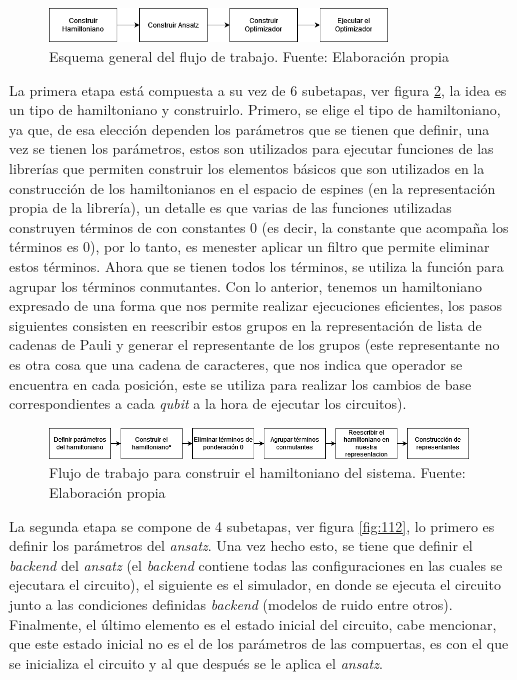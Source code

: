 \begin{figure}[H]
\centering
\includegraphics[width=0.8\textwidth]{figures/S3/flujogeneral.png}
\caption{\label{fig:110} Esquema general del flujo de trabajo. Fuente: Elaboración propia}
\end{figure}

La primera etapa está compuesta a su vez de 6 subetapas, ver figura \ref{fig:111}, la idea es un tipo de hamiltoniano y construirlo. Primero, se elige el tipo de hamiltoniano, ya que, de esa elección dependen los parámetros que se tienen que definir, una vez se tienen los parámetros, estos son utilizados para ejecutar funciones de las librerías que permiten construir los elementos básicos que son utilizados en la construcción de los hamiltonianos en el espacio de espines (en la representación propia de la librería), un detalle es que varias de las funciones utilizadas construyen términos de con constantes 0 (es decir, la constante que acompaña los términos es 0), por lo tanto, es menester aplicar un filtro que permite eliminar estos términos. Ahora que se tienen todos los términos, se utiliza la función para agrupar los términos conmutantes. Con lo anterior, tenemos un hamiltoniano expresado de una forma que nos permite realizar ejecuciones eficientes, los pasos siguientes consisten en reescribir estos grupos en la representación de lista de cadenas de Pauli y generar el representante de los grupos (este representante no es otra cosa que una cadena de caracteres, que nos indica que operador se encuentra en cada posición, este se utiliza para realizar los cambios de base correspondientes a cada \textit{qubit} a la hora de ejecutar los circuitos).

\begin{figure}[H]
\centering
\includegraphics[width=0.99\textwidth]{figures/S3/flujo1.png}
\caption{\label{fig:111} Flujo de trabajo para construir el hamiltoniano del sistema. Fuente: Elaboración propia}
\end{figure}


La segunda etapa se compone de 4 subetapas, ver figura \ref{fig:112}, lo primero es definir los parámetros del \textit{ansatz}. Una vez hecho esto, se tiene que definir el \textit{backend} del \textit{ansatz} (el \textit{backend} contiene todas las configuraciones en las cuales se ejecutara el circuito), el siguiente es el simulador, en donde se ejecuta el circuito junto a las condiciones definidas \textit{backend} (modelos de ruido entre otros). Finalmente, el último elemento es el estado inicial del circuito, cabe mencionar, que este estado inicial no es el de los parámetros de las compuertas, es con el que se inicializa el circuito y al que después se le aplica el \textit{ansatz}.

